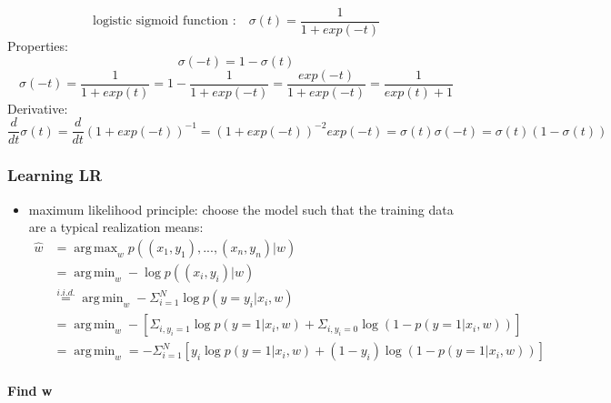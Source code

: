 \documentclass[11pt]{article}
\DeclareMathOperator*{\argmin}{arg\,min}
\DeclareMathOperator*{\argmax}{arg\,max}
\begin{document}
      \begin{equation*}
        \text{logistic sigmoid function :} \quad \sigma(t) = \frac{1}{1 + exp(-t)}
      \end{equation*}
      Properties:
      \begin{equation*}
        \sigma(-t) = 1 - \sigma(t)
      \end{equation*}
      \begin{equation*}
        \sigma(-t) = \frac{1}{1 + exp(t)} = 1- \frac{1}{1+ exp(-t)} = \frac{exp(-t)}{1+ exp(-t)} = \frac{1}{exp(t) + 1}
      \end{equation*}
      Derivative:
      \begin{equation*}
        \frac{d}{dt} \sigma(t) = \frac{d}{dt} (1+exp(-t))^{-1} = (1+exp(-t))^{-2}exp(-t) = \sigma(t)\sigma(-t) = \sigma(t)(1 - \sigma(t))
      \end{equation*}
      \subsubsection{Learning LR}
        \begin{itemize}
          \item maximum likelihood principle: choose the model such that the training data are a typical
          realization means:
          \begin{equation*}
            \begin{align*}
              \hat{w} &= \argmax_{w} p((x_{1}, y_{1}), ..., (x_{n}, y_{n})|w) \\
              &= \argmin_{w} - \log p((x_{i}, y_{i})|w) \\
              &\stackrel{i.i.d.}{=} \argmin_{w} -\Sigma_{i=1}^{N} \log p(y=y_{i}|x_i,w) \\
              &= \argmin_{w} -[\Sigma_{i, y_{i} = 1} \log p(y=1|x_{i},w) +
               \Sigma_{i, y_{i} = 0} \log(1-p(y=1|x_{i},w))] \\
              &= \argmin_{w}  = -\Sigma_{i=1}^{N} [y_{i} \log p(y=1|x_{i},w) +
              (1- y_{i})\log(1-p(y=1|x_{i},w))]
            \end{align*}
          \end{equation*}
        \end{itemize}
        \paragraph{Find w}
\end{document}
